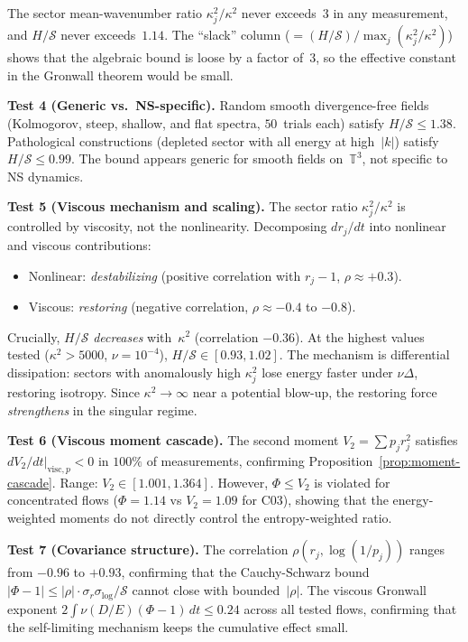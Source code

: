 \documentclass[11pt]{article}
\theoremstyle{definition}
\newcommand{\T}{\mathbb{T}}
\newcommand{\cS}{\mathcal{S}}
\begin{document}
The sector mean-wavenumber ratio $\kappa_j^2/\kappa^2$
never exceeds~$3$ in any measurement, and $H/\cS$ never
exceeds~$1.14$.  The ``slack'' column
($= (H/\cS)/\max_j(\kappa_j^2/\kappa^2)$) shows that the
algebraic bound is loose by a factor of~$3$, so the
effective constant in the Gronwall theorem would be small.

\noindent\textbf{Test 4 (Generic vs.\ NS-specific).}
Random smooth divergence-free fields (Kolmogorov, steep,
shallow, and flat spectra, $50$~trials each) satisfy
$H/\cS \leq 1.38$.  Pathological constructions
(depleted sector with all energy at high~$|k|$) satisfy
$H/\cS \leq 0.99$.  The bound appears generic for
smooth fields on~$\T^3$, not specific to NS dynamics.

\noindent\textbf{Test 5 (Viscous mechanism and scaling).}
The sector ratio $\kappa_j^2/\kappa^2$ is controlled by
viscosity, not the nonlinearity.  Decomposing
$dr_j/dt$ into nonlinear and viscous contributions:
\begin{itemize}
\item Nonlinear: \emph{destabilizing}
(positive correlation with $r_j - 1$,
$\rho \approx +0.3$).
\item Viscous: \emph{restoring}
(negative correlation, $\rho \approx -0.4$ to $-0.8$).
\end{itemize}
Crucially, $H/\cS$ \emph{decreases} with~$\kappa^2$
(correlation $-0.36$).  At the highest values tested
($\kappa^2 > 5000$, $\nu = 10^{-4}$), $H/\cS \in [0.93, 1.02]$.
The mechanism is differential dissipation: sectors with
anomalously high $\kappa_j^2$ lose energy faster under
$\nu\Delta$, restoring isotropy.  Since $\kappa^2 \to \infty$
near a potential blow-up, the restoring force
\emph{strengthens} in the singular regime.

\noindent\textbf{Test 6 (Viscous moment cascade).}
The second moment $V_2 = \sum p_j r_j^2$ satisfies
$dV_2/dt|_{\mathrm{visc},p} < 0$ in $100\%$ of
measurements, confirming
Proposition~\ref{prop:moment-cascade}.  Range:
$V_2 \in [1.001, 1.364]$.  However, $\Phi \leq V_2$
is violated for concentrated flows ($\Phi = 1.14$
vs $V_2 = 1.09$ for C03), showing that the
energy-weighted moments do not directly control the
entropy-weighted ratio.

\noindent\textbf{Test 7 (Covariance structure).}
The correlation $\rho(r_j, \log(1/p_j))$ ranges from
$-0.96$ to $+0.93$, confirming that the Cauchy-Schwarz
bound $|\Phi - 1| \leq |\rho|\cdot\sigma_r\sigma_{\log}/\cS$
cannot close with bounded~$|\rho|$.  The viscous
Gronwall exponent $2\int\nu(D/E)(\Phi-1)\,dt \leq 0.24$
across all tested flows, confirming that the
self-limiting mechanism keeps the cumulative effect small.
\end{document}

